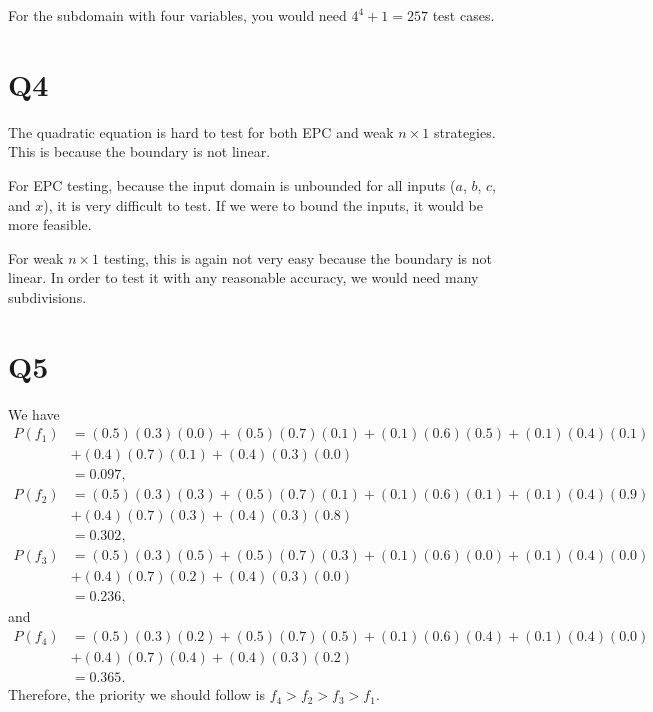 \documentclass[12pt, letterpaper, titlepage]{article}
\begin{document}
For the subdomain with four variables, you would need $4^4+1 = 257$ test cases.

\section*{Q4}
The quadratic equation is hard to test for both EPC and weak $n\times1$ strategies. This is because the boundary is not linear.

For EPC testing, because the input domain is unbounded for all inputs ($a$, $b$, $c$, and $x$), it is very difficult to test. If we were to bound the inputs, it would be more feasible.

For weak $n\times1$ testing, this is again not very easy because the boundary is not linear. In order to test it with any reasonable accuracy, we would need many subdivisions.

\section*{Q5}
We have
\begin{align}
    P(f_1) &= (0.5)(0.3)(0.0) + (0.5)(0.7)(0.1) + (0.1)(0.6)(0.5) + (0.1)(0.4)(0.1) \\ 
            &+ (0.4)(0.7)(0.1) + (0.4)(0.3)(0.0) \\
    &= 0.097,
\end{align}
\begin{align}
    P(f_2) &= (0.5)(0.3)(0.3) + (0.5)(0.7)(0.1) + (0.1)(0.6)(0.1) + (0.1)(0.4)(0.9) \\ 
            &+ (0.4)(0.7)(0.3) + (0.4)(0.3)(0.8) \\
    &= 0.302,
\end{align}
\begin{align}
    P(f_3) &= (0.5)(0.3)(0.5) + (0.5)(0.7)(0.3) + (0.1)(0.6)(0.0) + (0.1)(0.4)(0.0) \\ 
            &+ (0.4)(0.7)(0.2) + (0.4)(0.3)(0.0) \\
    &= 0.236,
\end{align}
and
\begin{align}
    P(f_4) &= (0.5)(0.3)(0.2) + (0.5)(0.7)(0.5) + (0.1)(0.6)(0.4) + (0.1)(0.4)(0.0) \\ 
            &+ (0.4)(0.7)(0.4) + (0.4)(0.3)(0.2) \\
    &= 0.365.
\end{align}
Therefore, the priority we should follow is $f_4 > f_2 > f_3 > f_1$.
\end{document}
